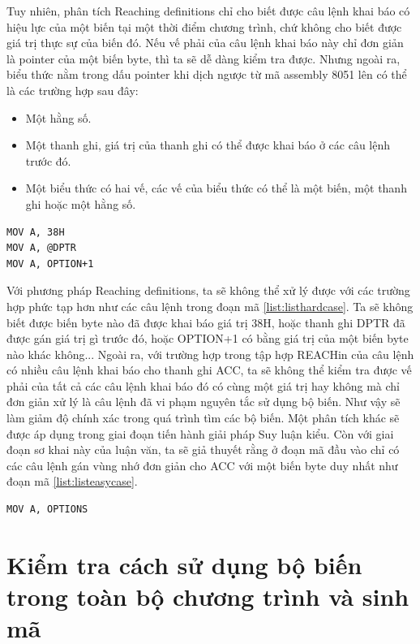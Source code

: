 Tuy nhiên, phân tích Reaching definitions chỉ cho biết được câu lệnh khai báo có hiệu lực của một biến tại một thời điểm chương trình, chứ không cho biết được giá trị thực sự của biến đó. Nếu vế phải của câu lệnh khai báo này chỉ đơn giản là pointer của một biến byte, thì ta sẽ dễ dàng kiểm tra được. Nhưng ngoài ra, biểu thức nằm trong dấu pointer khi dịch ngược từ mã assembly 8051 lên có thể là các trường hợp sau đây:
\begin{itemize}
	\item Một hằng số.
		\item Một thanh ghi, giá trị của thanh ghi có thể được khai báo ở các câu lệnh trước đó.
	\item Một biểu thức có hai vế, các vế của biểu thức có thể là một biến, một thanh ghi hoặc một hằng số.

\end{itemize}

\begin{lstlisting}[caption={Một số câu lệnh gán mà phương pháp Suy luận kiểu sử dụng Reaching definitions không xử lý được},label={list:listhardcase}]
MOV A, 38H
MOV A, @DPTR
MOV A, OPTION+1
\end{lstlisting}
Với phương pháp Reaching definitions, ta sẽ không thể xử lý được với các trường hợp phức tạp hơn như các câu lệnh trong đoạn mã \ref{list:listhardcase}. Ta sẽ không biết được biến byte nào đã được khai báo giá trị 38H, hoặc thanh ghi DPTR đã được gán giá trị gì trước đó, hoặc OPTION+1 có bằng giá trị của một biến byte nào khác không... Ngoài ra, với trường hợp trong tập hợp REACHin của câu lệnh có nhiều câu lệnh khai báo cho thanh ghi ACC, ta sẽ không thể kiểm tra được vế phải của tất cả các câu lệnh khai báo đó có cùng một giá trị hay không mà chỉ đơn giản xử lý là câu lệnh đã vi phạm nguyên tắc sử dụng bộ biến. Như vậy sẽ làm giảm độ chính xác trong quá trình tìm các bộ biến. Một phân tích khác sẽ được áp dụng trong giai đoạn tiến hành giải pháp Suy luận kiểu. Còn với giai đoạn sơ khai này của luận văn, ta sẽ giả thuyết rằng ở đoạn mã đầu vào chỉ có các câu lệnh gán vùng nhớ đơn giản cho ACC với một biến byte duy nhất như đoạn mã \ref{list:listeasycase}.
\begin{lstlisting}[caption={Mẫu câu lệnh gán cho thanh ghi ACC được chấp nhận hiện giờ},label={list:listeasycase}]
MOV A, OPTIONS
\end{lstlisting}
\section{Kiểm tra cách sử dụng bộ biến trong toàn bộ chương trình và sinh mã}

